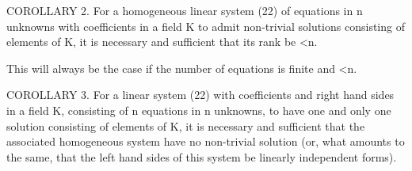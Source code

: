 COROLLARY 2. For a homogeneous linear system (22) of equations in n unknowns with coefficients in a field K to admit non-trivial solutions consisting of elements of K, it is necessary and sufficient that its rank be \textless n.

This will always be the case if the number of equations is finite and \textless n.

COROLLARY 3. For a linear system (22) with coefficients and right hand sides in a field K, consisting of n equations in n unknowns, to have one and only one solution consisting of elements of K, it is necessary and sufficient that the associated homogeneous system have no non-trivial solution (or, what amounts to the same, that the left hand sides of this system be linearly independent forms).

